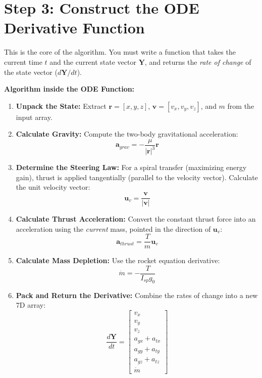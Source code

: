 \documentclass[11pt, letterpaper]{article}
\begin{document}
\section*{Step 3: Construct the ODE Derivative Function}
This is the core of the algorithm. You must write a function that takes the current time $t$ and the current state vector $\boldsymbol{Y}$, and returns the \textit{rate of change} of the state vector ($d\boldsymbol{Y}/dt$).

\textbf{Algorithm inside the ODE Function:}
\begin{enumerate}
    \item \textbf{Unpack the State:} Extract $\boldsymbol{r} = [x, y, z]$, $\boldsymbol{v} = [v_x, v_y, v_z]$, and $m$ from the input array.
    \item \textbf{Calculate Gravity:} Compute the two-body gravitational acceleration:
    \begin{equation}
        \boldsymbol{a}_{grav} = -\frac{\mu}{|\boldsymbol{r}|^3} \boldsymbol{r}
    \end{equation}
    \item \textbf{Determine the Steering Law:} For a spiral transfer (maximizing energy gain), thrust is applied tangentially (parallel to the velocity vector). Calculate the unit velocity vector:
    \begin{equation}
        \boldsymbol{u}_v = \frac{\boldsymbol{v}}{|\boldsymbol{v}|}
    \end{equation}
    \item \textbf{Calculate Thrust Acceleration:} Convert the constant thrust force into an acceleration using the \textit{current} mass, pointed in the direction of $\boldsymbol{u}_v$:
    \begin{equation}
        \boldsymbol{a}_{thrust} = \frac{T}{m} \boldsymbol{u}_v
    \end{equation}
    \item \textbf{Calculate Mass Depletion:} Use the rocket equation derivative:
    \begin{equation}
        \dot{m} = -\frac{T}{I_{sp} g_0}
    \end{equation}
    \item \textbf{Pack and Return the Derivative:} Combine the rates of change into a new 7D array:
    \begin{equation}
        \frac{d\boldsymbol{Y}}{dt} = 
        \begin{bmatrix}
            v_x \\ v_y \\ v_z \\ a_{gx} + a_{tx} \\ a_{gy} + a_{ty} \\ a_{gz} + a_{tz} \\ \dot{m}
        \end{bmatrix}
    \end{equation}
\end{enumerate}
\end{document}
